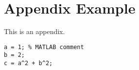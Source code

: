 \chapter{Appendix Example}\label{app:appendix_example}

This is an appendix.

\begin{lstlisting}
a = 1; % MATLAB comment
b = 2;
c = a^2 + b^2;
\end{lstlisting}

